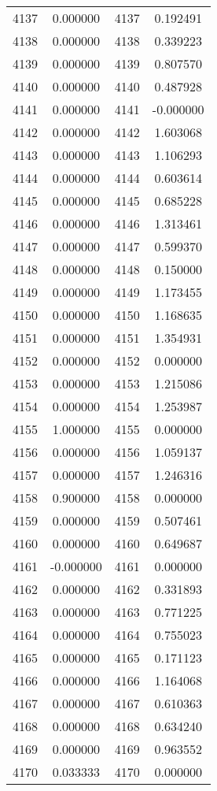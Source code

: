 \documentclass[12pt]{article}
\begin{document}
\begin{longtable}{@{}cccc@{}}
4137 & 0.000000 & 4137 & 0.192491 \\
4138 & 0.000000 & 4138 & 0.339223 \\
4139 & 0.000000 & 4139 & 0.807570 \\
4140 & 0.000000 & 4140 & 0.487928 \\
4141 & 0.000000 & 4141 & -0.000000 \\
4142 & 0.000000 & 4142 & 1.603068 \\
4143 & 0.000000 & 4143 & 1.106293 \\
4144 & 0.000000 & 4144 & 0.603614 \\
4145 & 0.000000 & 4145 & 0.685228 \\
4146 & 0.000000 & 4146 & 1.313461 \\
4147 & 0.000000 & 4147 & 0.599370 \\
4148 & 0.000000 & 4148 & 0.150000 \\
4149 & 0.000000 & 4149 & 1.173455 \\
4150 & 0.000000 & 4150 & 1.168635 \\
4151 & 0.000000 & 4151 & 1.354931 \\
4152 & 0.000000 & 4152 & 0.000000 \\
4153 & 0.000000 & 4153 & 1.215086 \\
4154 & 0.000000 & 4154 & 1.253987 \\
4155 & 1.000000 & 4155 & 0.000000 \\
4156 & 0.000000 & 4156 & 1.059137 \\
4157 & 0.000000 & 4157 & 1.246316 \\
4158 & 0.900000 & 4158 & 0.000000 \\
4159 & 0.000000 & 4159 & 0.507461 \\
4160 & 0.000000 & 4160 & 0.649687 \\
4161 & -0.000000 & 4161 & 0.000000 \\
4162 & 0.000000 & 4162 & 0.331893 \\
4163 & 0.000000 & 4163 & 0.771225 \\
4164 & 0.000000 & 4164 & 0.755023 \\
4165 & 0.000000 & 4165 & 0.171123 \\
4166 & 0.000000 & 4166 & 1.164068 \\
4167 & 0.000000 & 4167 & 0.610363 \\
4168 & 0.000000 & 4168 & 0.634240 \\
4169 & 0.000000 & 4169 & 0.963552 \\
4170 & 0.033333 & 4170 & 0.000000 \\

\end{longtable}
\end{document}
